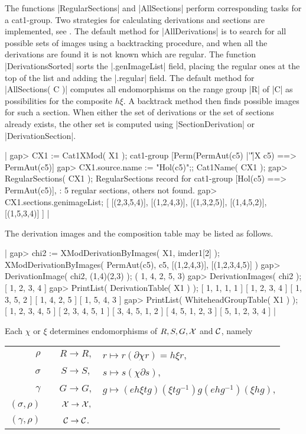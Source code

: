 The    functions     |RegularSections|  and   |AllSections|    perform
corresponding tasks for  a cat1-group.  Two strategies for calculating
derivations and sections are implemented, see \cite{xmodAW1}.  The default
method for |AllDerivations|   is to search for  all  possible sets  of
images using  a backtracking procedure,  and when all  the derivations
are  found   it  is  not   known  which   are regular.  The   function
|DerivationsSorted|  sorts  the  |.genImageList|  field,  placing  the
regular ones at the top  of the list  and adding the |.regular| field.
The  default method for |AllSections( C  )| computes all endomorphisms
on the  range  group |R|  of  |C| as possibilities  for  the composite
$h\xi$.  A  backtrack  method then  finds  possible images  for such a
section.  When  either the set of derivations  or the  set of sections
already exists, the other set is computed using |SectionDerivation| or
|DerivationSection|.

|    gap> CX1 := Cat1XMod( X1 );
    cat1-group [Perm(PermAut(c5) |'\|'|X c5) ==> PermAut(c5)] 
    gap> CX1.source.name := "Hol(c5)";; Cat1Name( CX1 );
    gap> RegularSections( CX1 );
    RegularSections record for cat1-group [Hol(c5) ==> PermAut(c5)],
    : 5 regular sections, others not found.
    gap> CX1.sections.genimageList;
    [ [(2,3,5,4)], [(1,2,4,3)], [(1,3,2,5)], [(1,4,5,2)], [(1,5,3,4)] ]  |

The derivation images and the composition table may be listed as follows.

|    gap> chi2 := XModDerivationByImages( X1, imder1[2] ); 
    XModDerivationByImages( PermAut(c5), c5, [(1,2,4,3)], [(1,2,3,4,5)] )
    gap> DerivationImage( chi2, (1,4)(2,3) );
    ( 1, 4, 2, 5, 3)
    gap> DerivationImages( chi2 );
    [ 1, 2, 3, 4 ]
    gap> PrintList( DerivationTable( X1 ) );
    [ 1, 1, 1, 1 ]
    [ 1, 2, 3, 4 ]
    [ 1, 3, 5, 2 ]
    [ 1, 4, 2, 5 ]
    [ 1, 5, 4, 3 ]
    gap> PrintList( WhiteheadGroupTable( X1 ) );
    [ 1, 2, 3, 4, 5 ]
    [ 2, 3, 4, 5, 1 ]
    [ 3, 4, 5, 1, 2 ]
    [ 4, 5, 1, 2, 3 ]
    [ 5, 1, 2, 3, 4 ]  |


Each $\chi$ or $\xi$  determines endomorphisms of $R,  S, G, {\cal X}$
and ${\cal C}$, namely\:
\begin{center}
\begin{tabular}{rccl}
    $\rho$  &  \:  &  $R \to R,$ 
                  &  $r \mapsto r(\partial \chi r) = h \xi r$,  \\
  $\sigma$  &  \:  &  $S \to S,$
                  &  $s \mapsto s(\chi \partial s)$,            \\
  $\gamma$  &  \:  &  $G \to G,$
                  &  $g \mapsto (eh \xi tg)(\xi tg^{-1})g(ehg^{-1})(\xi hg)$,\\
  $(\sigma,\rho)$ & \:  & ${\cal X} \to {\cal X},$              \\
  $(\gamma,\rho)$ & \:  & ${\cal C} \to {\cal C}$.
\end{tabular}
\end{center}

